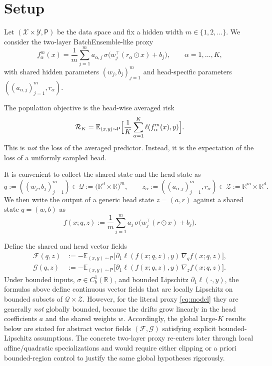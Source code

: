 \documentclass{article}
\theoremstyle{definition}
\newcommand{\R}{\mathbb{R}}
\newcommand{\E}{\mathbb{E}}
\begin{document}
\section{Setup}
\label{sec:setup}

Let $(\mathcal X\times\mathcal Y,\mathsf P)$ be the data space and fix a hidden width $m\in\{1,2,\dots\}$. We consider the two-layer BatchEnsemble-like proxy
\begin{equation}
  f_\alpha^m(x)
  =
  \frac1m\sum_{j=1}^m
  a_{\alpha,j}\,
  \sigma\bigl(w_j^\top(r_\alpha\odot x)+b_j\bigr),
  \qquad
  \alpha=1,\dots,K,
  \label{eq:model}
\end{equation}
with shared hidden parameters $(w_j,b_j)_{j=1}^m$ and head-specific parameters $((a_{\alpha,j})_{j=1}^m,r_\alpha)$.

The population objective is the head-wise averaged risk
\begin{equation}
  \mathcal R_K
  =
  \E_{(x,y)\sim\mathsf P}
  \Bigl[
    \frac1K\sum_{\alpha=1}^K \ell(f_\alpha^m(x),y)
  \Bigr].
  \label{eq:riskK}
\end{equation}
This is \emph{not} the loss of the averaged predictor. Instead, it is the expectation of the loss of a uniformly sampled head.

It is convenient to collect the shared state and the head state as
\[
  q:=((w_j,b_j)_{j=1}^m)\in\mathcal Q:=\bigl(\R^d\times\R\bigr)^m,
  \qquad
  z_\alpha:=((a_{\alpha,j})_{j=1}^m,r_\alpha)\in\mathcal Z:=\R^m\times\R^d.
\]
We then write the output of a generic head state $z=(a,r)$ against a shared state $q=(w,b)$ as
\begin{equation}
  f(x;q,z)
  :=
  \frac1m\sum_{j=1}^m a_j\,\sigma\bigl(w_j^\top(r\odot x)+b_j\bigr).
  \label{eq:generic-output}
\end{equation}

Define the shared and head vector fields
\begin{align}
  \mathcal F(q,z)
  &:=
  -\E_{(x,y)\sim\mathsf P}
  \bigl[
    \partial_1\ell(f(x;q,z),y)\,\nabla_q f(x;q,z)
  \bigr],
  \label{eq:Fdef}
  \\
  \mathcal G(q,z)
  &:=
  -\E_{(x,y)\sim\mathsf P}
  \bigl[
    \partial_1\ell(f(x;q,z),y)\,\nabla_z f(x;q,z)
  \bigr].
  \label{eq:Gdef}
\end{align}
Under bounded inputs, $\sigma\in C_b^1(\R)$, and bounded Lipschitz $\partial_1\ell(\cdot,y)$, the formulas above define continuous vector fields that are locally Lipschitz on bounded subsets of $\mathcal Q\times\mathcal Z$. However, for the literal proxy \eqref{eq:model} they are generally \emph{not} globally bounded, because the drifts grow linearly in the head coefficients $a$ and the shared weights $w$. Accordingly, the global large-$K$ results below are stated for abstract vector fields $(\mathcal F,\mathcal G)$ satisfying explicit bounded-Lipschitz assumptions. The concrete two-layer proxy re-enters later through local affine/quadratic specializations and would require either clipping or a priori bounded-region control to justify the same global hypotheses rigorously.
\end{document}
